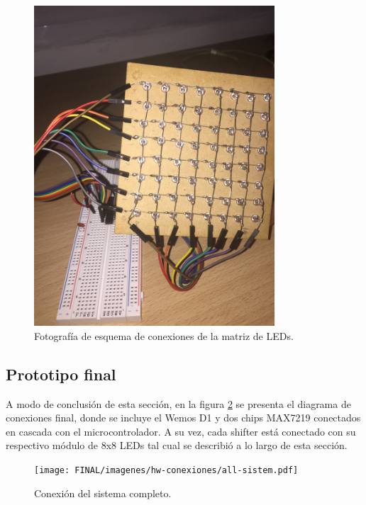     \begin{figure}[ht!]
    	\begin{center}
    		\includegraphics[width=0.8\textwidth]{imagenes/hw-conexiones/moduloLED.JPG}
    		\caption{Fotografía de esquema de conexiones de la matriz de LEDs.}
    		\label{fig:hw-moduloLED-real}
    	\end{center}
    \end{figure}
    
    \subsection{Prototipo final}
    A modo de conclusión de esta sección, en la figura \ref{fig:hw-conexionado-final} se presenta el diagrama de conexiones final, donde se incluye el Wemos D1 y dos chips MAX7219 conectados en cascada con el microcontrolador. A su vez, cada shifter está conectado con su respectivo módulo de 8x8 LEDs tal cual se describió a lo largo de esta sección.
    
    \begin{figure}[ht!]
        \centering
        \begin{center}
            \texttt{[image: FINAL/imagenes/hw-conexiones/all-sistem.pdf]}
            \caption{Conexión del sistema completo.}
            \label{fig:hw-conexionado-final}
        \end{center}
    \end{figure}
    
